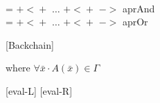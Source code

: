 \begin{definition}\\
   =  $\mathsf{+\!<\!+}$
  $\ldots$ $\mathsf{+\!<\!+}$ $->$ aprAnd \\
   =  $\mathsf{+\!<\!+}$
  $\ldots$ $\mathsf{+\!<\!+}$ $->$ aprOr
\end{definition}

\begin{definition}[Backchain]

\end{definition}

[Backchain]

where $\forall \bar{x}\cdot A(\bar{x})\in\Gamma$


\begin{definition}[Eval]
  
\end{definition}

[eval-L]
[eval-R]










